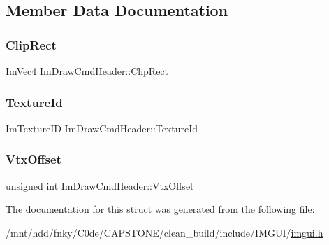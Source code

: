 \subsection{Member Data Documentation}
\mbox{\label{structImDrawCmdHeader_a576deba50bb9b646ddee16d4fd096bf4}} 
\subsubsection{\texorpdfstring{Clip\+Rect}{ClipRect}}
{\footnotesize\ttfamily \hyperlink{structImVec4}{Im\+Vec4} Im\+Draw\+Cmd\+Header\+::\+Clip\+Rect}

\mbox{\label{structImDrawCmdHeader_a09a7455ca6cbce7e64b1604da08b9ad1}} 
\subsubsection{\texorpdfstring{Texture\+Id}{TextureId}}
{\footnotesize\ttfamily Im\+Texture\+ID Im\+Draw\+Cmd\+Header\+::\+Texture\+Id}

\mbox{\label{structImDrawCmdHeader_a88b7d50043b0a8b299aaa94a9a3cf121}} 
\subsubsection{\texorpdfstring{Vtx\+Offset}{VtxOffset}}
{\footnotesize\ttfamily unsigned int Im\+Draw\+Cmd\+Header\+::\+Vtx\+Offset}



The documentation for this struct was generated from the following file\+:\begin{DoxyCompactItemize}
\item 
/mnt/hdd/fnky/\+C0de/\+C\+A\+P\+S\+T\+O\+N\+E/clean\+\_\+build/include/\+I\+M\+G\+U\+I/\hyperlink{imgui_8h}{imgui.\+h}\end{DoxyCompactItemize}
